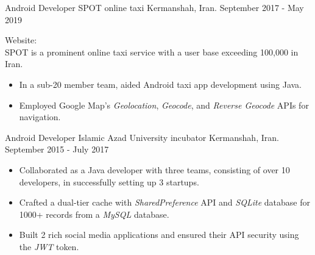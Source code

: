 \begin{experiences}
{\begin{itemize}
\end{itemize}
}{}
\emptySeparator
\experience
  {}
  {Android Developer}
  {SPOT online taxi}
  {Kermanshah, Iran. \hspace{140 pt} September 2017 - May 2019}
  {}
  {
  Website: \\
  SPOT is a prominent online taxi service with a user base exceeding 100,000 in Iran. 
  \begin{itemize}
    \item In a sub-20 member team, aided Android taxi app development using Java.
    \item Employed Google Map's \emph{Geolocation}, \emph{Geocode}, and \emph{Reverse Geocode} APIs for navigation.\end{itemize}
  }{}

\emptySeparator

\experience
{}
{Android Developer}
{Islamic Azad University incubator}
{Kermanshah, Iran. \hspace{60 pt} September 2015 - July 2017}
{}
{
\begin{itemize}
\item Collaborated as a Java developer with three teams, consisting of over 10 developers, in successfully setting up 3 startups.
\item Crafted a dual-tier cache with \emph{SharedPreference} API and \emph{SQLite} database for 1000+ records from a \emph{MySQL} database.
\item Built 2 rich social media applications and ensured their API security using the \emph{JWT} token.
\end{itemize}
}{}
\end{experiences}